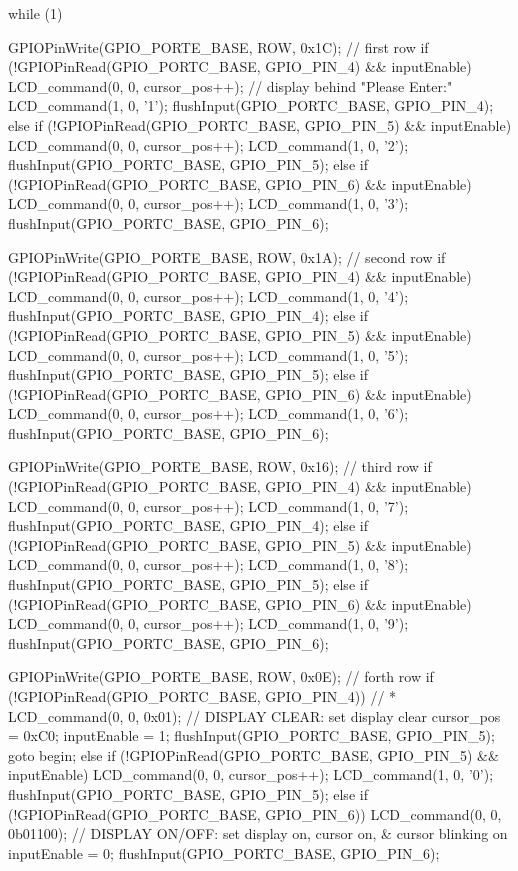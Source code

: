 \documentclass[12pt, a4paper]{article}
\begin{document}
\begin{code}
{    while (1)
    {

        GPIOPinWrite(GPIO_PORTE_BASE, ROW, 0x1C); // first row
        if (!GPIOPinRead(GPIO_PORTC_BASE, GPIO_PIN_4) && inputEnable)
        {
            LCD_command(0, 0, cursor_pos++); // display behind "Please Enter:"
            LCD_command(1, 0, '1');
            flushInput(GPIO_PORTC_BASE, GPIO_PIN_4);
        }
        else if (!GPIOPinRead(GPIO_PORTC_BASE, GPIO_PIN_5) && inputEnable)
        {
            LCD_command(0, 0, cursor_pos++);
            LCD_command(1, 0, '2');
            flushInput(GPIO_PORTC_BASE, GPIO_PIN_5);
        }
        else if (!GPIOPinRead(GPIO_PORTC_BASE, GPIO_PIN_6) && inputEnable)
        {
            LCD_command(0, 0, cursor_pos++);
            LCD_command(1, 0, '3');
            flushInput(GPIO_PORTC_BASE, GPIO_PIN_6);
        }

        GPIOPinWrite(GPIO_PORTE_BASE, ROW, 0x1A); // second row
        if (!GPIOPinRead(GPIO_PORTC_BASE, GPIO_PIN_4) && inputEnable)
        {
            LCD_command(0, 0, cursor_pos++);
            LCD_command(1, 0, '4');
            flushInput(GPIO_PORTC_BASE, GPIO_PIN_4);
        }
        else if (!GPIOPinRead(GPIO_PORTC_BASE, GPIO_PIN_5) && inputEnable)
        {
            LCD_command(0, 0, cursor_pos++);
            LCD_command(1, 0, '5');
            flushInput(GPIO_PORTC_BASE, GPIO_PIN_5);
        }
        else if (!GPIOPinRead(GPIO_PORTC_BASE, GPIO_PIN_6) && inputEnable)
        {
            LCD_command(0, 0, cursor_pos++);
            LCD_command(1, 0, '6');
            flushInput(GPIO_PORTC_BASE, GPIO_PIN_6);
        }

        GPIOPinWrite(GPIO_PORTE_BASE, ROW, 0x16); // third row
        if (!GPIOPinRead(GPIO_PORTC_BASE, GPIO_PIN_4) && inputEnable)
        {
            LCD_command(0, 0, cursor_pos++);
            LCD_command(1, 0, '7');
            flushInput(GPIO_PORTC_BASE, GPIO_PIN_4);
        }
        else if (!GPIOPinRead(GPIO_PORTC_BASE, GPIO_PIN_5) && inputEnable)
        {
            LCD_command(0, 0, cursor_pos++);
            LCD_command(1, 0, '8');
            flushInput(GPIO_PORTC_BASE, GPIO_PIN_5);
        }
        else if (!GPIOPinRead(GPIO_PORTC_BASE, GPIO_PIN_6) && inputEnable)
        {
            LCD_command(0, 0, cursor_pos++);
            LCD_command(1, 0, '9');
            flushInput(GPIO_PORTC_BASE, GPIO_PIN_6);
        }

        GPIOPinWrite(GPIO_PORTE_BASE, ROW, 0x0E); // forth row
        if (!GPIOPinRead(GPIO_PORTC_BASE, GPIO_PIN_4)) // *
        {
            LCD_command(0, 0, 0x01); // DISPLAY CLEAR: set display clear
            cursor_pos = 0xC0;
            inputEnable = 1;
            flushInput(GPIO_PORTC_BASE, GPIO_PIN_5);
            goto begin;
        }
        else if (!GPIOPinRead(GPIO_PORTC_BASE, GPIO_PIN_5) && inputEnable)
        {
            LCD_command(0, 0, cursor_pos++);
            LCD_command(1, 0, '0');
            flushInput(GPIO_PORTC_BASE, GPIO_PIN_5);
        }
        else if (!GPIOPinRead(GPIO_PORTC_BASE, GPIO_PIN_6))
        {
            LCD_command(0, 0, 0b01100); // DISPLAY ON/OFF: set display on, cursor on, & cursor blinking on
            inputEnable = 0;
            flushInput(GPIO_PORTC_BASE, GPIO_PIN_6);
        }

}}
\end{code}
\end{document}
